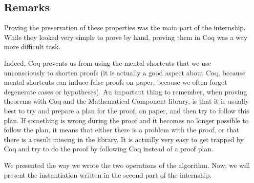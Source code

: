 \documentclass[a4paper,10pt]{article}
\begin{document}
\subsection{Remarks}

Proving the preservation of these properties was the main part of the internship. While they looked very simple to prove by hand, proving them in {\sc Coq} was a way more difficult task.

Indeed, {\sc Coq} prevents us from using the mental shortcuts that we use unconsciously to shorten proofs (it is actually a good aspect about {\sc Coq}, because mental shortcuts can induce false proofs on paper, because we often forget degenerate cases or hypotheses). An important thing to remember, when proving theorems with {\sc Coq} and the {\sc Mathematical Component} library, is that it is usually best to try and prepare a plan for the proof, on paper, and then try to follow this plan.  If something is wrong during the proof and it becomes no longer possible to follow the plan, it means that either there is a problem with the proof, or that there is a result missing in the library. It is actually very easy to get trapped by {\sc Coq} and try to do the proof by following {\sc Coq} instead of a proof plan.

We presented the way we wrote the two operations of the algorithm. Now, we will present the instantiation written in the second part of the internship.
\end{document}
